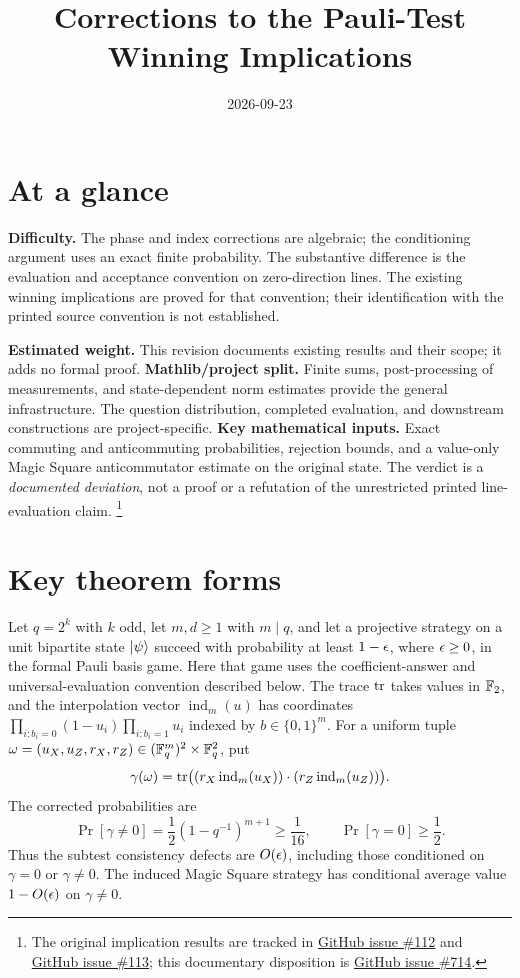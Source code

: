 \documentclass[11pt]{article}
\title{Corrections to the Pauli-Test Winning Implications}
\author{}
\date{2026-09-23}
\newcommand{\ind}{\operatorname{ind}}
\renewcommand{\ghissue}[1]{%
  \href{https://github.com/Dengnifer/MIPStarRE-QPBT/issues/#1}{GitHub issue \##1}}
\begin{document}
\maketitle

\section{At a glance}

\textbf{Difficulty.} The phase and index corrections are algebraic; the
conditioning argument uses an exact finite probability. The substantive
difference is the evaluation and acceptance convention on zero-direction
lines. The existing winning implications are proved for that convention;
their identification with the printed source convention is not established.

\textbf{Estimated weight.} This revision documents existing results and their
scope; it adds no formal proof. \textbf{Mathlib/project split.} Finite sums,
post-processing of measurements, and state-dependent norm estimates provide
the general infrastructure. The question distribution, completed evaluation,
and downstream constructions are project-specific.
\textbf{Key mathematical inputs.} Exact commuting and anticommuting probabilities, rejection bounds,
and a value-only Magic Square anticommutator estimate on the original state.
The verdict is a \emph{documented deviation}, not a proof or a refutation of
the unrestricted printed line-evaluation claim.%
\footnote{The original implication results are tracked in \ghissue{112} and
\ghissue{113}; this documentary disposition is \ghissue{714}.}

\section{Key theorem forms}

Let $q=2^k$ with $k$ odd, let $m,d\geq1$ with $m\mid q$, and let a projective
strategy on a unit bipartite state $\ket\psi$ succeed with probability at least
$1-\epsilon$, where $\epsilon\geq0$, in the formal Pauli basis game. Here that game
uses the coefficient-answer and universal-evaluation convention described
below. The trace $\mathrm{tr}$ takes values in $\mathbb{F}_2$, and the interpolation vector
$\ind_m(u)$ has coordinates
$\prod_{i:b_i=0}(1-u_i)\prod_{i:b_i=1}u_i$ indexed by
$b\in\{0,1\}^m$. For a uniform tuple
$\omega=(u_X,u_Z,r_X,r_Z)\in(\mathbb{F}_q^m)^2\times\mathbb{F}_q^2$, put
\[
  \gamma(\omega)
  =\tr\big((r_X\ind_m(u_X))\cdot(r_Z\ind_m(u_Z))\big).
\]
The corrected probabilities are
\[
  \Pr[\gamma\ne0]=\frac12(1-q^{-1})^{m+1}\geq\frac1{16},
  \qquad \Pr[\gamma=0]\geq\frac12.
\]
Thus the subtest consistency defects are $O(\epsilon)$, including those
conditioned on $\gamma=0$ or $\gamma\ne0$. The induced Magic Square strategy
has conditional average value $1-O(\epsilon)$ on $\gamma\ne0$.
\end{document}
